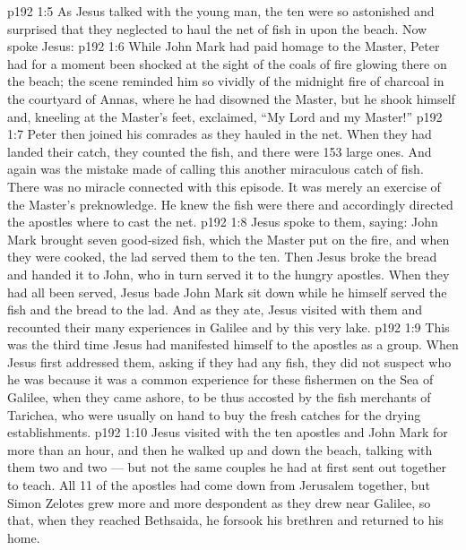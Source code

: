 \vs p192 1:5 As Jesus talked with the young man, the ten were so astonished and surprised that they neglected to haul the net of fish in upon the beach. Now spoke Jesus: 
\vs p192 1:6 While John Mark had paid homage to the Master, Peter had for a moment been shocked at the sight of the coals of fire glowing there on the beach; the scene reminded him so vividly of the midnight fire of charcoal in the courtyard of Annas, where he had disowned the Master, but he shook himself and, kneeling at the Master’s feet, exclaimed, “My Lord and my Master!”
\vs p192 1:7 Peter then joined his comrades as they hauled in the net. When they had landed their catch, they counted the fish, and there were 153 large ones. And again was the mistake made of calling this another miraculous catch of fish. There was no miracle connected with this episode. It was merely an exercise of the Master’s preknowledge. He knew the fish were there and accordingly directed the apostles where to cast the net.
\vs p192 1:8 Jesus spoke to them, saying:  John Mark brought seven good\hyp{}sized fish, which the Master put on the fire, and when they were cooked, the lad served them to the ten. Then Jesus broke the bread and handed it to John, who in turn served it to the hungry apostles. When they had all been served, Jesus bade John Mark sit down while he himself served the fish and the bread to the lad. And as they ate, Jesus visited with them and recounted their many experiences in Galilee and by this very lake.
\vs p192 1:9 \pc This was the third time Jesus had manifested himself to the apostles as a group. When Jesus first addressed them, asking if they had any fish, they did not suspect who he was because it was a common experience for these fishermen on the Sea of Galilee, when they came ashore, to be thus accosted by the fish merchants of Tarichea, who were usually on hand to buy the fresh catches for the drying establishments.
\vs p192 1:10 \pc Jesus visited with the ten apostles and John Mark for more than an hour, and then he walked up and down the beach, talking with them two and two --- but not the same couples he had at first sent out together to teach. All 11 of the apostles had come down from Jerusalem together, but Simon Zelotes grew more and more despondent as they drew near Galilee, so that, when they reached Bethsaida, he forsook his brethren and returned to his home.

